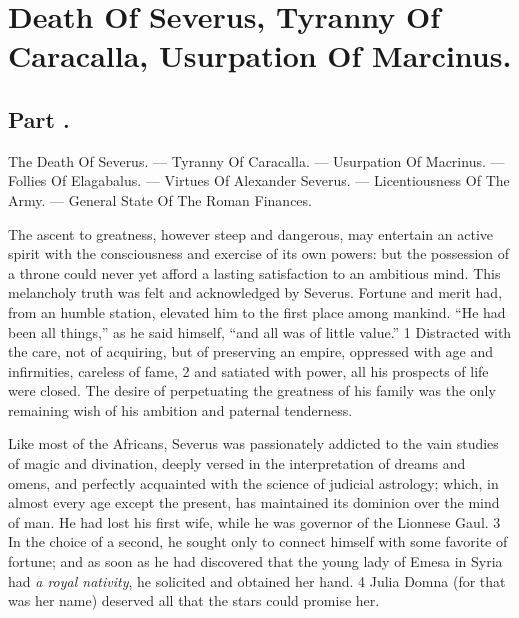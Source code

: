 \chapter{Death Of Severus, Tyranny Of Caracalla, Usurpation Of Marcinus.}
\section{Part \thesection.}

The Death Of Severus. — Tyranny Of Caracalla. — Usurpation Of
Macrinus. — Follies Of Elagabalus. — Virtues Of Alexander
Severus. — Licentiousness Of The Army. — General State Of The Roman
Finances.
\vspace{\onelineskip}

The ascent to greatness, however steep and dangerous, may
entertain an active spirit with the consciousness and exercise of
its own powers: but the possession of a throne could never yet
afford a lasting satisfaction to an ambitious mind. This
melancholy truth was felt and acknowledged by Severus. Fortune
and merit had, from an humble station, elevated him to the first
place among mankind. “He had been all things,” as he said
himself, “and all was of little value.” 1 Distracted with the
care, not of acquiring, but of preserving an empire, oppressed
with age and infirmities, careless of fame, 2 and satiated with
power, all his prospects of life were closed. The desire of
perpetuating the greatness of his family was the only remaining
wish of his ambition and paternal tenderness.



Like most of the Africans, Severus was passionately addicted to
the vain studies of magic and divination, deeply versed in the
interpretation of dreams and omens, and perfectly acquainted with
the science of judicial astrology; which, in almost every age
except the present, has maintained its dominion over the mind of
man. He had lost his first wife, while he was governor of the
Lionnese Gaul. 3 In the choice of a second, he sought only to
connect himself with some favorite of fortune; and as soon as he
had discovered that the young lady of Emesa in Syria had \textit{a royal
nativity}, he solicited and obtained her hand. 4 Julia Domna (for
that was her name) deserved all that the stars could promise her.

